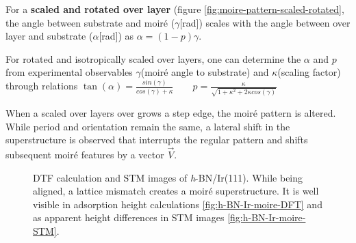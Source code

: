 For a \textbf{scaled and rotated over layer} (figure \ref{fig:moire-pattern-scaled-rotated}, the angle between substrate and moir\'e ($\gamma$[rad]) scales with the angle between over layer and substrate ($\alpha$[rad]) as $\alpha=(1-p)\gamma$.

For rotated and isotropically scaled over layers, one can determine the $\alpha$ and $p$ from experimental observables $\gamma$(moir\'e angle to substrate) and $\kappa$(scaling factor) through relations $ \tan(\alpha)=\frac{sin(\gamma)}{cos(\gamma)+\kappa}\qquad p=\frac{\kappa}{\sqrt{1+\kappa^2+2\kappa cos(\gamma)}}$

When a scaled over layers over grows a step edge, the moir\'e pattern is altered. While period and orientation remain the same, a lateral shift in the superstructure is observed that interrupts the regular pattern and shifts subsequent moir\'e features by a vector $\vec{V}$.

\begin{figure} \centering
	 \qquad
	\caption{DTF calculation and STM images of \textit{h}-BN/Ir(111). While being aligned, a lattice mismatch creates a moir\'e  superstructure. It is well visible in adsorption height calculations \ref{fig:h-BN-Ir-moire-DFT} and as apparent height differences in STM images \ref{fig:h-BN-Ir-moire-STM}.}
	\label{fig:moire-DFT-TSM}
\end{figure}


